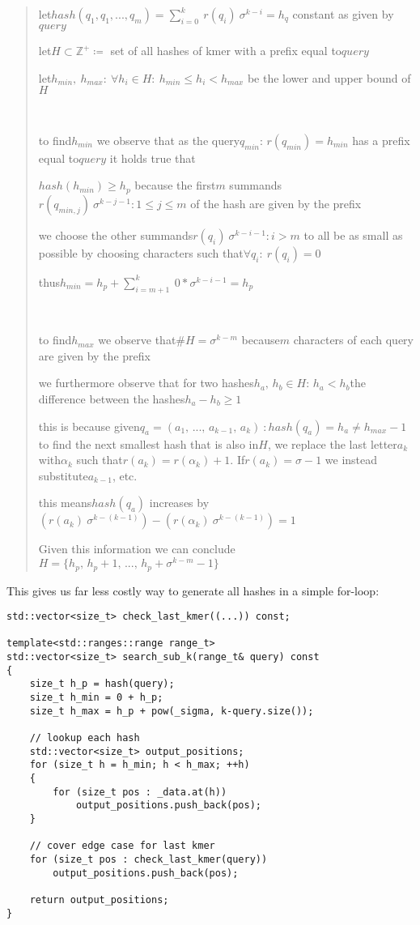 \begin{verse}
let$hash(q_{1},q_{1},...,q_{m})=\sum_{i=0}^{k}\:r(q_{i})\:\sigma^{k-i}=h_{q}$
constant as given by$query$

let$H\subset\mathbb{Z}^{+}\coloneqq$ set of all hashes of kmer with
a prefix equal to$query$

let$h_{min},\:h_{max}:\:\forall h_{i}\in H:\:h_{min}\leq h_{i}<h_{max}$
be the lower and upper bound of$H$

~

to find$h_{min}$ we observe that as the query$q_{min}:\,r(q_{min})=h_{min}$
has a prefix equal to$query$ it holds true that

$hash(h_{min})\geq h_{p}$ because the first$m$ summands$r(q_{min,j})\:\sigma^{k-j-1}:1\leq j\leq m$
of the hash are given by the prefix

we choose the other summands$r(q_{i})\:\sigma^{k-i-1}:i>m$ to all
be as small as possible by choosing characters such that$\forall q_{i}:\:r(q_{i})=0$

thus$h_{min}=h_{p}+\sum_{i=m+1}^{k}\:0*\sigma^{k-i-1}=h_{p}$

~

to find$h_{max}$ we observe that$\#H=\sigma^{k-m}$ because$m$ characters
of each query are given by the prefix

we furthermore observe that for two hashes$h_{a},\,h_{b}\in H:\,h_{a}<h_{b}$the
difference between the hashes$h_{a}-h_{b}\geq1$

this is because given$q_{a}=(a_{1},\,...,\,a_{k-1},\,a_{k})\::hash(q_{a})=h_{a}\neq h_{max}-1$
to find the next smallest hash that is also in$H$, we replace the
last letter$a_{k}$ with$\alpha_{k}$ such that$r(a_{k})=r(\alpha_{k})+1$.
If$r(a_{k})=\sigma-1$ we instead substitute$a_{k-1}$, etc.

this means$hash(q_{a})$ increases by$(r(a_{k})\:\sigma^{k-(k-1)})-(r(\alpha_{k})\:\sigma^{k-(k-1)})=1$

Given this information we can conclude$H=\{h_{p},\,h_{p}+1,\,...,\,h_{p}+\sigma^{k-m}-1\}$
\end{verse}
This gives us far less costly way to generate all hashes in a simple
for-loop:

\begin{lstlisting}[caption={Search function for queries of size 0 < m < k},language={[GNU]C++},tabsize=2]
std::vector<size_t> check_last_kmer((...)) const;

template<std::ranges::range range_t>
std::vector<size_t> search_sub_k(range_t& query) const
{
	size_t h_p = hash(query);
	size_t h_min = 0 + h_p;
	size_t h_max = h_p + pow(_sigma, k-query.size());

	// lookup each hash
	std::vector<size_t> output_positions;
	for (size_t h = h_min; h < h_max; ++h)
	{
		for (size_t pos : _data.at(h))
			output_positions.push_back(pos);
	}

	// cover edge case for last kmer
	for (size_t pos : check_last_kmer(query))
		output_positions.push_back(pos);

	return output_positions;
}
\end{lstlisting}


